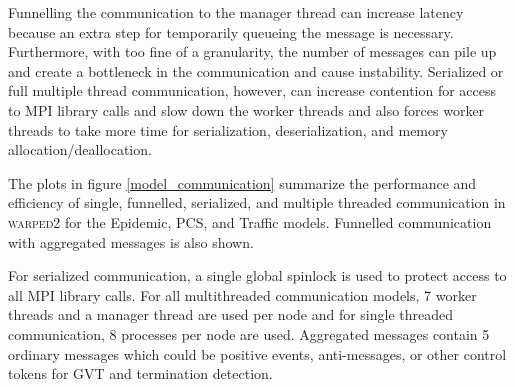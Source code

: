 \documentclass[11pt]{book}
\begin{document}
Funnelling the communication to the manager thread can increase latency because an extra step
for temporarily queueing the message is necessary.  Furthermore, with too fine of a granularity,
the number of messages can pile up and create a bottleneck in the communication and cause
instability.  Serialized or full multiple thread communication, however, can increase contention
for access to MPI library calls and slow down the worker threads and also forces worker
threads to take more time for serialization, deserialization, and memory allocation/deallocation.

The plots in figure \ref{model_communication} summarize the performance and efficiency of single,
funnelled, serialized, and multiple threaded communication in \textsc{warped2} for the Epidemic,
PCS, and Traffic models.  Funnelled communication with aggregated messages is also shown.

For serialized communication, a single global spinlock is used to protect access to all MPI library
calls.  For all multithreaded communication models, 7 worker threads and a manager thread are used
per node and for single threaded communication, 8 processes per node are used.  Aggregated messages
contain 5 ordinary messages which could be positive events, anti-messages, or other control
tokens for GVT and termination detection.
\end{document}
